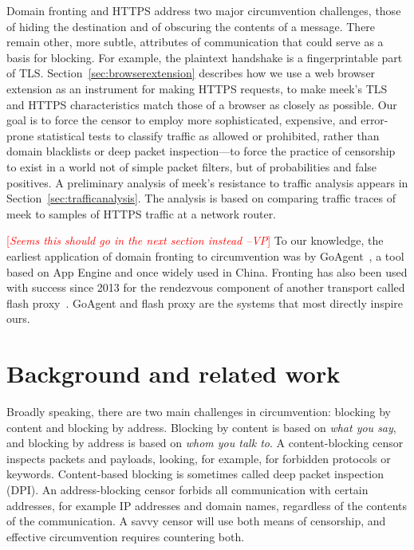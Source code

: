 \documentclass{sig-alternate}
\newcommand{\meek}{meek\xspace}
\newcommand{\note}[1]{{\textcolor{red}{[\textit{#1}]}}}
\newcommand{\vp}[1]{\note{#1 --VP}}
\begin{document}
Domain fronting and HTTPS address two major circumvention challenges,
those of hiding the destination and of obscuring the contents of a message.
There remain other, more subtle, attributes of communication
that could serve as a basis for blocking.
For example, the plaintext handshake is a fingerprintable part of TLS.
Section~\ref{sec:browserextension} describes how we use a web browser extension as an instrument for making HTTPS requests,
to make \meek's TLS and HTTPS characteristics
match those of a browser as closely as possible.
Our goal is to force the censor
to employ more sophisticated, expensive, and error-prone statistical tests
to classify traffic as allowed or prohibited,
rather than domain blacklists or deep packet inspection---to
force the practice of censorship to exist in a world
not of simple packet filters,
but of probabilities and false positives.
A preliminary analysis of \meek's resistance to traffic analysis
appears in Section~\ref{sec:trafficanalysis}.
The analysis is based on comparing traffic traces of \meek
to samples of HTTPS traffic at a network router.

\vp{Seems this should go in the next section instead}
To our knowledge,
the earliest application of domain fronting to circumvention
was by GoAgent~\cite{goagent},
a tool based on App Engine and
once widely used in China.
Fronting has also been used with success since 2013
for the rendezvous component of another transport called flash proxy~\cite{flashproxy}.
GoAgent and flash proxy are the systems that most directly
inspire ours.


\section{Background and related work}
\label{sec:related-work}

Broadly speaking, there are two main challenges in circumvention:
blocking by content and blocking by address.
Blocking by content is based on \emph{what you say},
and blocking by address is based on \emph{whom you talk to}.
A content-blocking censor inspects packets and payloads,
looking, for example, for forbidden protocols or keywords.
Content-based blocking is sometimes called deep packet inspection (DPI).
An address-blocking censor forbids all communication with certain
addresses, for example IP addresses and domain names, regardless of
the contents of the communication.
A savvy censor will use both means of censorship, and
effective circumvention requires countering both.
\end{document}
